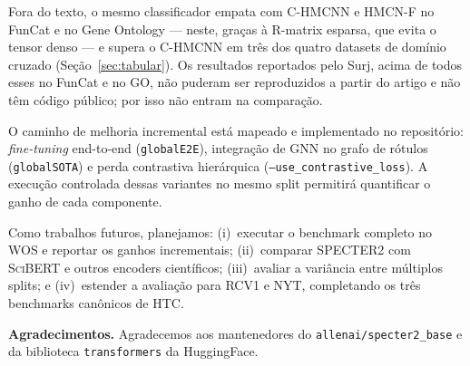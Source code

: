 \documentclass[11pt,a4paper,twoside]{article}
\begin{document}
Fora do texto, o mesmo classificador empata com C-HMCNN e HMCN-F no FunCat e no
Gene Ontology --- neste, graças à R-matrix esparsa, que evita o tensor denso ---
e supera o C-HMCNN em três dos quatro datasets de domínio cruzado
(Seção~\ref{sec:tabular}).  Os resultados reportados pelo Surj, acima de todos
esses no FunCat e no GO, não puderam ser reproduzidos a partir do artigo e
não têm código público; por isso não entram na comparação.

O caminho de melhoria incremental está mapeado e implementado no repositório:
\textit{fine-tuning} end-to-end (\texttt{globalE2E}), integração de GNN no grafo
de rótulos (\texttt{globalSOTA}) e perda contrastiva hierárquica
(\texttt{--use\_contrastive\_loss}). A execução controlada dessas variantes no
mesmo split permitirá quantificar o ganho de cada componente.

Como trabalhos futuros, planejamos: (i)~executar o benchmark completo no WOS e
reportar os ganhos incrementais; (ii)~comparar \textsc{SPECTER2} com
\textsc{SciBERT} e outros encoders científicos; (iii)~avaliar a variância entre
múltiplos splits; e (iv)~estender a avaliação para RCV1 e NYT, completando os
três benchmarks canônicos de HTC.

\vspace{0.6em}
\noindent\textbf{Agradecimentos.}
Agradecemos aos mantenedores do \texttt{allenai/specter2\_base}
\cite{cohan2020specter} e da biblioteca \texttt{transformers} da HuggingFace.
\end{document}
